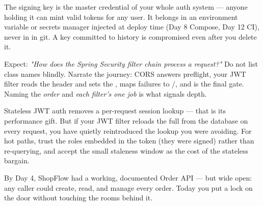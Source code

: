 \begin{secwarn}
The signing key is the master credential of your whole auth system --- anyone holding it can mint valid tokens for any user. It belongs in an environment variable or secrets manager injected at deploy time (Day 8 Compose, Day 12 CI), never in  in git. A key committed to history is compromised even after you delete it.
\end{secwarn}

\begin{interview}
Expect: \emph{"How does the Spring Security filter chain process a request?"} Do not list class names blindly. Narrate the journey: CORS answers preflight, your JWT filter reads the header and sets the ,  maps failures to /, and  is the final gate. Naming the \emph{order} and \emph{each filter's one job} is what signals depth.
\end{interview}

\begin{perfnote}
Stateless JWT auth removes a per-request session lookup --- that is its performance gift. But if your JWT filter reloads the full  from the database on every request, you have quietly reintroduced the lookup you were avoiding. For hot paths, trust the roles embedded in the token (they were signed) rather than re-querying, and accept the small staleness window as the cost of the stateless bargain.
\end{perfnote}


By Day 4, ShopFlow had a working, documented Order API --- but wide open: any caller could create, read, and manage every order. Today you put a lock on the door without touching the rooms behind it.

